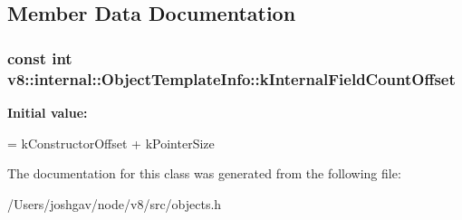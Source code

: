 \subsection{Member Data Documentation}
\subsubsection[{\texorpdfstring{k\+Internal\+Field\+Count\+Offset}{kInternalFieldCountOffset}}]{\setlength{\rightskip}{0pt plus 5cm}const int v8\+::internal\+::\+Object\+Template\+Info\+::k\+Internal\+Field\+Count\+Offset\hspace{0.3cm}{\ttfamily [static]}}\hypertarget{classv8_1_1internal_1_1_object_template_info_ad8de4c8ea2787200b80095e8457146ad}{}\label{classv8_1_1internal_1_1_object_template_info_ad8de4c8ea2787200b80095e8457146ad}
{\bfseries Initial value\+:}
\begin{DoxyCode}
=
      kConstructorOffset + kPointerSize
\end{DoxyCode}


The documentation for this class was generated from the following file\+:\begin{DoxyCompactItemize}
\item 
/\+Users/joshgav/node/v8/src/objects.\+h\end{DoxyCompactItemize}
